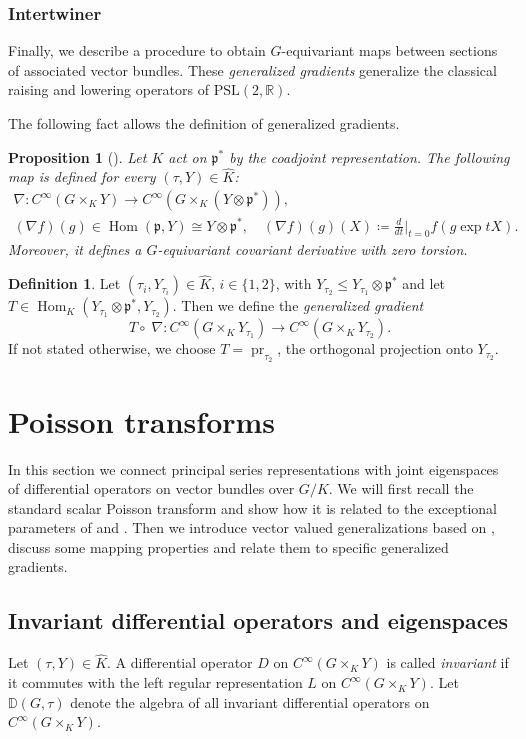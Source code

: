 \documentclass[JEP,XML,SOM,NoFloatCountersInSection,Unicode,published]{cedram}
\newtheorem{proposition}[theorem]{Proposition}
\theoremstyle{definition}
\newtheorem{definition}[theorem]{Definition}
\renewcommand{\d}[1][t]{\ensuremath{\frac{d}{d#1}\Big|_{#1=0}}}
\newcommand{\mf}[1]{\ensuremath{\mathfrak{#1}}}
\newcommand{\on}[1]{\ensuremath{\operatorname{#1}}}
\newcommand{\Hom}[3]{\ensuremath{\on{Hom}_{#1}(#2,#3)}}
\newcommand{\R}{\ensuremath{\mathbb{R}}}
\begin{document}
\subsubsection*{Intertwiner}
Finally, we describe a procedure to obtain $G$-equi\-vari\-ant maps \hbox{between} sections of associated vector bundles. These \emph{generalized gradients} generalize the classical raising and lowering operators of $\mathrm{PSL}(2,\R)$.

The following fact allows the definition of generalized gradients.
\begin{proposition}[{\cf \cite[Prop.\,3.1]{oersted}}]\label{prop:oersted_nabla}
Let $K$ act on $\mf p^*$ by the coadjoint representation. The following map is defined for every $(\tau, Y)\in\hat K$:\vspace*{-3pt}
\begin{gather*}
\nabla: C^\infty(G\times_KY)\to C^\infty(G\times_K(Y\otimes\mf p^*)),\\
(\nabla f)(g)\in\on{Hom}(\mf p, Y)\cong Y\otimes\mf p^*,\quad (\nabla f)(g)(X)\coloneqq\d f(g\exp tX).
\end{gather*}
Moreover, it defines a $G$-equivariant covariant derivative with zero torsion.
\end{proposition}
\begin{definition}\label{def:gen_grad}
Let $(\tau_i, Y_{\tau_i})\in\hat K$, $i\in\{1,2\}$, with $Y_{\tau_2}\leq Y_{\tau_1}\otimes\mf p^*$ and let $T\in\Hom{K}{Y_{\tau_1}\otimes\mf p^*}{Y_{\tau_2}}$.
Then we define the \emph{generalized gradient}\vspace*{-3pt}
\[
T\circ\;\nabla: C^\infty(G\times_KY_{\tau_1})\to C^\infty(G\times_KY_{\tau_2}).
\]
If not stated otherwise, we choose $T=\on{pr}_{\tau_2}$, the orthogonal projection onto $Y_{\tau_2}$.
\end{definition}
\section{Poisson transforms}\label{sec:PT}
In this section we connect principal series representations with joint eigenspaces of differential operators on vector bundles over $G/K$.
We will first recall the standard scalar Poisson transform and show how it is related to the exceptional parameters of \cite{DFG} and \cite{GHWb}.
Then we introduce vector valued generalizations based on \cite{Ol}, discuss some mapping properties and relate them to specific generalized gradients.
\subsection{Invariant differential operators and eigenspaces}\label{sec:3.1}
Let $(\tau,Y)\in\hat K$. A differential operator $D$ on $C^\infty(G\times_KY)$ is called \emph{invariant} if it commutes with the left regular representation $L$ on $C^\infty(G\times_KY)$.
Let $\mathbb{D}(G,\tau)$ denote the algebra of all invariant differential operators on $C^\infty(G\times_KY)$.
\end{document}
